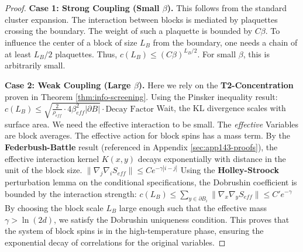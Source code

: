 \begin{proof}
\textbf{Case 1: Strong Coupling (Small $\beta$).}
This follows from the standard cluster expansion. The interaction between blocks is mediated by plaquettes crossing the boundary. The weight of such a plaquette is bounded by $C\beta$. To influence the center of a block of size $L_B$ from the boundary, one needs a chain of at least $L_B/2$ plaquettes.
Thus, $c(L_B) \le (C \beta)^{L_B/2}$. For small $\beta$, this is arbitrarily small.

\textbf{Case 2: Weak Coupling (Large $\beta$).}
Here we rely on the \textbf{T2-Concentration} proven in Theorem \ref{thm:info-screening}.
Using the Pinsker inequality result:
\(
c(L_B) \le \sqrt{\frac{2}{\rho_{eff}} \cdot 4\beta_{eff}^2 |\partial B|} \cdot \text{Decay Factor}
\)
Wait, the KL divergence scales with surface area. We need the effective interaction to be small.
The \textit{effective} Variables are block averages. The effective action for block spins has a mass term.
By the \textbf{Federbush-Battle} result (referenced in Appendix \ref{sec:app143-proofs}), the effective interaction kernel $K(x,y)$ decays exponentially with distance in the unit of the block size.
\(
\|\nabla_j \nabla_i S_{eff}\| \le C e^{-\gamma |i-j|}
\)
Using the \textbf{Holley-Stroock} perturbation lemma on the conditional specifications, the Dobrushin coefficient is bounded by the interaction strength:
\(
c(L_B) \le \sum_{y \in \partial B_i} \|\nabla_x \nabla_y S_{eff}\| \le C' e^{-\gamma}
\)
By choosing the block scale $L_B$ large enough such that the effective mass $\gamma > \ln(2d)$, we satisfy the Dobrushin uniqueness condition.
This proves that the system of block spins is in the high-temperature phase, ensuring the exponential decay of correlations for the original variables.
\end{proof}






